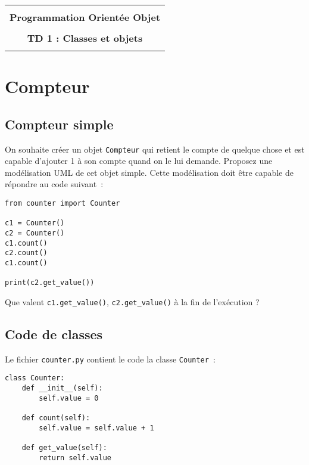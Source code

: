 \documentclass[12pt]{article}
\begin{document}
    \begin{center}
      \begin{tabular}{c}
      \hline
    \\
        {\bf \textsf {\Large Programmation Orientée Objet}}\\
    \\
        {\bf \textsf {\Large TD 1 : Classes et objets}}\\
    \\
        \hline
      \end{tabular}
    \end{center}
    \vspace{15mm}

\section{Compteur}
\subsection{Compteur simple\label{execution}}
On souhaite créer un objet \verb|Compteur| qui retient le compte de quelque chose et est capable d'ajouter 1 à son
compte quand on le lui demande.
Proposez une modélisation UML de cet objet simple. Cette modélisation doit être capable de répondre au code suivant~: \\


\begin{lstlisting}
from counter import Counter
    
c1 = Counter()
c2 = Counter()
c1.count()
c2.count()
c1.count()

print(c2.get_value())
\end{lstlisting}
Que valent \verb|c1.get_value()|, \verb|c2.get_value()| à la fin de l'exécution ? 

\subsection{Code de classes}
Le fichier \verb|counter.py| contient le code la classe \verb|Counter|~:

\begin{lstlisting}
class Counter:
    def __init__(self):
        self.value = 0
           
    def count(self):
        self.value = self.value + 1
    
    def get_value(self):
        return self.value
\end{lstlisting}
\end{document}
